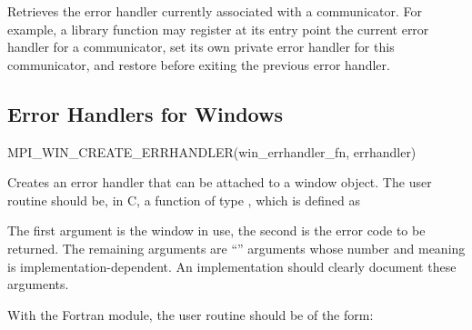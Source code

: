 Retrieves the error handler currently associated with a communicator.
%
For example, a
library function may register at its entry point the current error
handler for a
communicator, set its own private error handler for this communicator, and
restore before exiting the previous error handler.


\subsection{Error Handlers for Windows}
\label{subsec:inquiry-errhdlr-windows}

%
\begin{funcdef}{MPI\_WIN\_CREATE\_ERRHANDLER}{(\mbox{win\_errhandler\_fn}, \mbox{errhandler})}
\end{funcdef}
%
%

Creates an error handler that can be attached to a window object.
The user routine should be, in C, a
function of type
,
which is defined as

%

The first argument is the window in use, the second
is the error code to be returned.
The remaining arguments are ``'' arguments
whose number and meaning is implementation-dependent.  An implementation
should clearly document these arguments.

\noindent
With the Fortran  module, the user routine  should be of the form:


